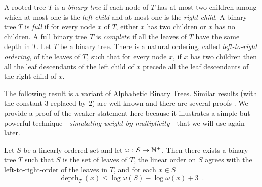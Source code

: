 \documentclass{patmorin}
\renewcommand{\le}{\leqslant}
\newcommand{\defin}[1]{\emph{\textcolor{brightmaroon}{#1}}}
\DeclareMathOperator{\depth}{depth}
\begin{document}
A rooted tree $T$ is a \defin{binary tree} if each node of $T$ has at most two children among which at most one is the \defin{left child} and at most one is the \defin{right child}.
A binary tree $T$ is \defin{full} if for every node $x$ of $T$,
either $x$ has two children or $x$ has no children.
A full binary tree $T$ is \defin{complete} if all the leaves of $T$ have the same depth in $T$.
Let $T$ be a binary tree. There is a natural ordering, called \defin{left-to-right ordering}, of the leaves of $T$, such that for every node $x$, if $x$ has two children then all the leaf descendants of the left child of $x$ precede all the leaf descendants of the right child of $x$.

The following result is a variant of Alphabetic Binary Trees. Similar results (with the constant $3$ replaced by $2$) are well-known and there are several proofs \cite{knuth:art_iii,mehlhorn:nearly,gilbert.moore:variable_length}. We provide a proof of the weaker statement here because it illustrates a simple but powerful technique---\defin{simulating weight by multiplicity}---that we will use again later.

\begin{lem}\label{shannon_fano_elias_tree}
  Let $S$ be a linearly ordered set and let $\omega:S\to\mathbb{N}^+$. Then there exists a binary tree $T$ such that $S$ is the set of leaves of $T$,
  the linear order on $S$ agrees with the left-to-right-order of the leaves in $T$, and for each $x\in S$
  \[
    \depth_{T}(x)\le \log\omega(S) - \log\omega(x) + 3 \enspace.
  \]
\end{lem}
\end{document}

